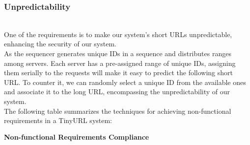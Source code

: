 \subsubsection{Unpredictability}\label{sK0DAlaotl87WDtkDK0Ll}
\\
One of the requirements is to make our system's short URLs unpredictable, enhancing the security of our system.
\\
As the sequencer generates unique IDs in a sequence and distributes ranges among servers. Each server has a pre-assigned range of unique IDs, assigning them serially to the requests will make it easy to predict the following short URL. To counter it, we can randomly select a unique ID from the available ones and associate it to the long URL, encompassing the unpredictability of our system.
\\
The following table summarizes the techniques for achieving non-functional requirements in a TinyURL system:

\textbf{Non-functional Requirements Compliance}

